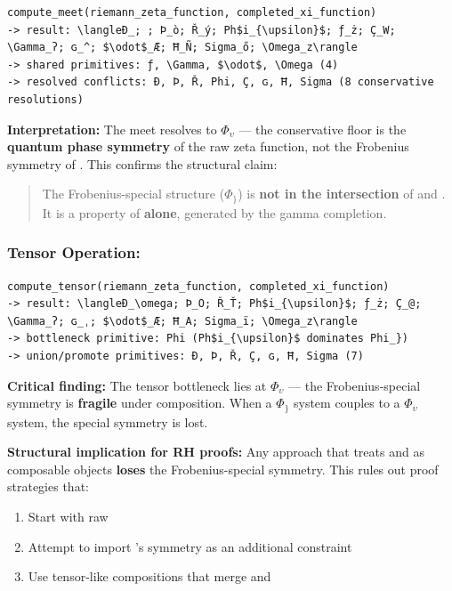 \documentclass[12pt,a4paper]{article}
\begin{document}
\begin{lstlisting}
compute_meet(riemann_zeta_function, completed_xi_function)
-> result: \langleÐ_; ; Þ_ò; Ř_ý; Ph$i_{\upsilon}$; ƒ_ż; Ç_W; \Gamma_ʔ; ɢ_^; $\odot$_Æ; Ħ_Ñ; Sigma_ő; \Omega_z\rangle
-> shared primitives: ƒ, \Gamma, $\odot$, \Omega (4)
-> resolved conflicts: Ð, Þ, Ř, Phi, Ç, ɢ, Ħ, Sigma (8 conservative resolutions)
\end{lstlisting}

\textbf{Interpretation:} The meet resolves to $\Phi_{\upsilon}$ --- the conservative floor is the \textbf{quantum phase symmetry} of the raw zeta function, not the Frobenius symmetry of \xi. This confirms the structural claim:

\begin{quote}
The Frobenius-special structure ($\Phi_{\}}$) is \textbf{not in the intersection} of \zeta and \xi. It is a property of \xi \textbf{alone}, generated by the gamma completion.

\end{quote}

\subsubsection{Tensor Operation: \zeta \otimes \xi}

\begin{lstlisting}
compute_tensor(riemann_zeta_function, completed_xi_function)
-> result: \langleÐ_\omega; Þ_O; Ř_Ť; Ph$i_{\upsilon}$; ƒ_ż; Ç_@; \Gamma_ʔ; ɢ_ˌ; $\odot$_Æ; Ħ_A; Sigma_ï; \Omega_z\rangle
-> bottleneck primitive: Phi (Ph$i_{\upsilon}$ dominates Phi_})
-> union/promote primitives: Ð, Þ, Ř, Ç, ɢ, Ħ, Sigma (7)
\end{lstlisting}

\textbf{Critical finding:} The tensor bottleneck lies at $\Phi_{\upsilon}$ --- the Frobenius-special symmetry is \textbf{fragile} under composition. When a $\Phi_{\}}$ system couples to a $\Phi_{\upsilon}$ system, the special symmetry is lost.

\textbf{Structural implication for RH proofs:} Any approach that treats \zeta and \xi as composable objects \textbf{loses} the Frobenius-special symmetry. This rules out proof strategies that:

\begin{enumerate}
    \item Start with raw \zeta
    \item Attempt to import \xi's symmetry as an additional constraint
    \item Use tensor-like compositions that merge \zeta and \xi
\end{enumerate}
\end{document}

